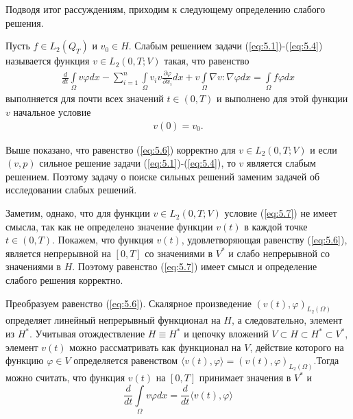 Подводя итог рассуждениям, приходим к следующему определению слабого решения.
\begin{definition}
    Пусть $f\in L_2(Q_T)$ и $v_0\in H$. Слабым решением задачи (\ref{eq:5.1})-(\ref{eq:5.4}) называется функция $v\in L_2(0, T;V)$ такая, что равенство
    \begin{equation}\label{eq:5.6}
        \begin{gathered}
            \frac{d}{dt}\int\limits_\Omega v \varphi dx-\sum_{i=1}^{n}\int\limits_\Omega v_i v
            \frac{\partial \varphi }{\partial x_i}dx + v\int\limits_\Omega \nabla v :\nabla\varphi dx=
            \int\limits_\Omega f \varphi dx
        \end{gathered}
    \end{equation}
    выполняется для почти всех значений $t \in (0, T)$ и выполнено для этой функции $v$ начальное условие
    \begin{equation}\label{eq:5.7}
        \begin{gathered}
            v(0) = v_0.
        \end{gathered}
    \end{equation}
\end{definition}

Выше показано, что равенство (\ref{eq:5.6}) корректно для $v \in L_2(0, T; V)$ и если $(v, p)$ сильное решение задачи (\ref{eq:5.1})-(\ref{eq:5.4}),
то $v$ является слабым решением. Поэтому задачу о поиске сильных решений заменим задачей об исследовании слабых решений.

Заметим, однако, что для функции $v \in L_2(0, T; V)$ условие (\ref{eq:5.7}) не имеет смысла, так как не определено значение функции $v(t)$ в каждой точке
$t \in (0, T)$. Покажем, что функция $v(t)$, удовлетворяющая равенству (\ref{eq:5.6}), является непрерывной на $[0, T]$ со значениями в $V^\ast$ и слабо
непрерывной со значениями в $H$. Поэтому равенство (\ref{eq:5.7}) имеет смысл и определение слабого решения корректно.

Преобразуем равенство (\ref{eq:5.6}). Скалярное произведение $(v(t), \varphi)_{L_2(\Omega)}$ определяет линейный непрерывный функционал на $H$, а следовательно,
элемент из $H^\ast$. Учитывая отождествление $H \equiv H^\ast$ и цепочку вложений $V \subset H \subset H^\ast \subset V^\ast$,
элемент $v(t)$ можно рассматривать как функционал на $V$, действие которого на функцию $\varphi \in V$ определяется равенством 
$\langle v(t),\varphi \rangle = (v(t),\varphi)_{L_2(\Omega)}$.Тогда можно считать, что функция $v(t)$ на $[0, T]$ принимает значения в $V^\ast$ и
$$\frac{d}{dt}\int\limits_\Omega v \varphi dx=\frac{d}{dt}\langle v(t),\varphi \rangle$$

